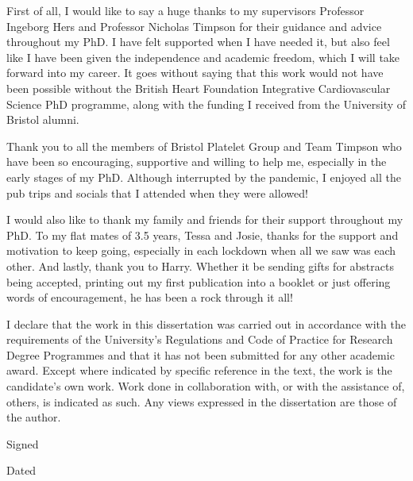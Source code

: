 \documentclass[11pt,twoside]{bristolthesis}
\begin{document}
  \begin{acknowledgements}
    First of all, I would like to say a huge thanks to my supervisors Professor Ingeborg Hers and Professor Nicholas Timpson for their guidance and advice throughout my PhD. I have felt supported when I have needed it, but also feel like I have been given the independence and academic freedom, which I will take forward into my career. It goes without saying that this work would not have been possible without the British Heart Foundation Integrative Cardiovascular Science PhD programme, along with the funding I received from the University of Bristol alumni.

    Thank you to all the members of Bristol Platelet Group and Team Timpson who have been so encouraging, supportive and willing to help me, especially in the early stages of my PhD. Although interrupted by the pandemic, I enjoyed all the pub trips and socials that I attended when they were allowed!

    I would also like to thank my family and friends for their support throughout my PhD. To my flat mates of 3.5 years, Tessa and Josie, thanks for the support and motivation to keep going, especially in each lockdown when all we saw was each other. And lastly, thank you to Harry. Whether it be sending gifts for abstracts being accepted, printing out my first publication into a booklet or just offering words of encouragement, he has been a rock through it all!
  \end{acknowledgements}
  \begin{declaration}
    I declare that the work in this dissertation was carried out in accordance with the requirements of the University's Regulations and Code of Practice for Research Degree Programmes and that it has not been submitted for any other academic award. Except where indicated by specific reference in the text, the work is the candidate's own work. Work done in collaboration with, or with the assistance of, others, is indicated as such. Any views expressed in the dissertation are those of the author.

    \bigskip
    \bigskip
    \bigskip
    \bigskip
    \bigskip

    Signed

    \bigskip
    \bigskip
    \bigskip
    \bigskip
    \bigskip

    Dated
  \end{declaration}
  \hypersetup{linkcolor=black}
  \setcounter{tocdepth}{3}
  \tableofcontents
  \listoftables
  \listoffigures
\end{document}
